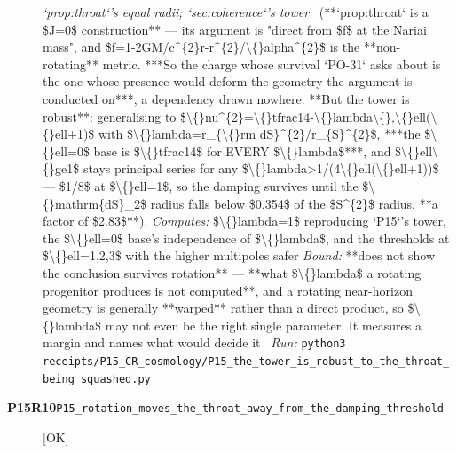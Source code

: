 \begin{description}
\textit{`prop:throat`'s equal radii; `sec:coherence`'s tower} \ (**`prop:throat` is a \$J=0\$ construction** --- its argument is "direct from \$f\$ at the Nariai mass", and \$f=1-2GM/c\textasciicircum{}\{2\}r-r\textasciicircum{}\{2\}/\textbackslash\{\}alpha\textasciicircum{}\{2\}\$ is the **non-rotating** metric. ***So the charge whose survival `PO-31` asks about is the one whose presence would deform the geometry the argument is conducted on***, a dependency drawn nowhere. **But the tower is robust**: generalising to \$\textbackslash\{\}nu\textasciicircum{}\{2\}=\textbackslash\{\}tfrac14-\textbackslash\{\}lambda\textbackslash\{\},\textbackslash\{\}ell(\textbackslash\{\}ell+1)\$ with \$\textbackslash\{\}lambda=r\_\{\textbackslash\{\}rm dS\}\textasciicircum{}\{2\}/r\_\{S\}\textasciicircum{}\{2\}\$, ***the \$\textbackslash\{\}ell=0\$ base is \$\textbackslash\{\}tfrac14\$ for EVERY \$\textbackslash\{\}lambda\$***, and \$\textbackslash\{\}ell\textbackslash\{\}ge1\$ stays principal series for any \$\textbackslash\{\}lambda>1/(4\textbackslash\{\}ell(\textbackslash\{\}ell+1))\$ --- \$1/8\$ at \$\textbackslash\{\}ell=1\$, so the damping survives until the \$\textbackslash\{\}mathrm\{dS\}\_2\$ radius falls below \$0.354\$ of the \$S\textasciicircum{}\{2\}\$ radius, **a factor of \$2.83\$**). 
\emph{Computes:} \$\textbackslash\{\}lambda=1\$ reproducing `P15`'s tower, the \$\textbackslash\{\}ell=0\$ base's independence of \$\textbackslash\{\}lambda\$, and the thresholds at \$\textbackslash\{\}ell=1,2,3\$ with the higher multipoles safer
 \emph{Bound:}  **does not show the conclusion survives rotation** --- **what \$\textbackslash\{\}lambda\$ a rotating progenitor produces is not computed**, and a rotating near-horizon geometry is generally **warped** rather than a direct product, so \$\textbackslash\{\}lambda\$ may not even be the right single parameter. It measures a margin and names what would decide it
\ \emph{Run:} \texttt{python3 receipts/P15\_CR\_cosmology/P15\_the\_tower\_is\_robust\_to\_the\_throat\_being\_squashed.py}
\item[\rcptlabel{P15_rotation_moves_the_throat_away_from_the_damping_threshold}{P15R10}\textbf{P15R10}\quad\texttt{P15\_rotation\_moves\_the\_throat\_away\_from\_the\_damping\_threshold}]\hfill\textsf{[OK]}\\

\end{description}
